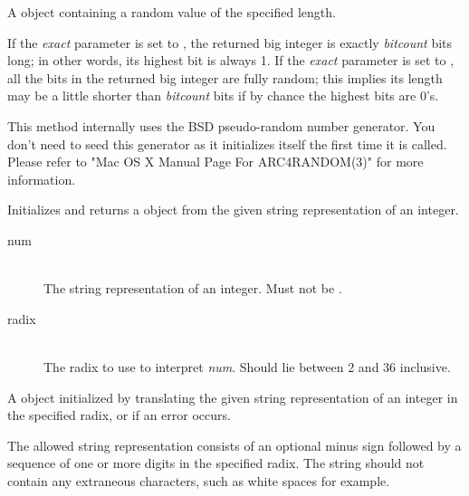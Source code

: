 \docretval

A  object containing a random value of the specified length.

\docdiscuss

If the \emph{exact} parameter is set to , the returned big integer is exactly \emph{bitcount} bits long; in other words, its highest bit is always 1. If the \emph{exact} parameter is set to , all the bits in the returned big integer are fully random; this implies its length may be a little shorter than \emph{bitcount} bits if by chance the highest bits are 0's.

This method internally uses the BSD  pseudo-random number generator. You don't need to seed this generator as it initializes itself the first time it is called. Please refer to "Mac OS X Manual Page For ARC4RANDOM(3)" for more information.



Initializes and returns a  object from the given string representation of an integer.


\docparams

\begin{description}
\item[num] \hfill \\ The string representation of an integer. Must not be .
\item[radix] \hfill \\ The radix to use to interpret \emph{num}. Should lie between 2 and 36 inclusive.
\end{description}

\docretval

A  object initialized by translating the given string representation of an integer in the specified radix, or  if an error occurs.

\docdiscuss

The allowed string representation consists of an optional minus sign followed by a sequence of one or more digits in the specified radix. The string should not contain any extraneous characters, such as white spaces for example.


